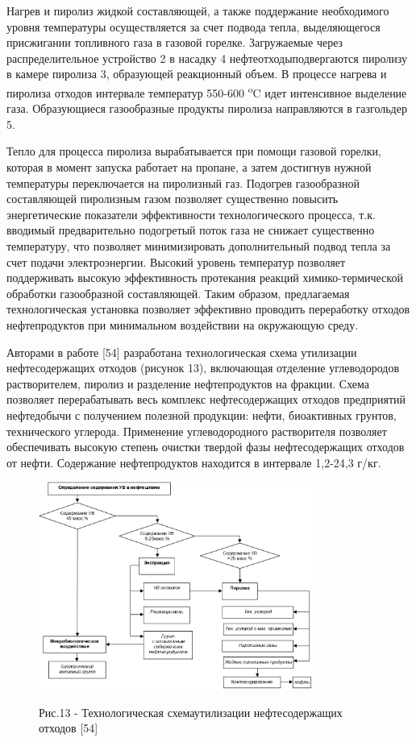 \begin{multicols}{2}
Нагрев и пиролиз жидкой составляющей, а также поддержание необходимого
уровня температуры осуществляется за счет подвода тепла, выделяющегося
присжигании топливного газа в газовой горелке. Загружаемые через
распределительное устройство 2 в насадку 4 нефтеотходыподвергаются
пиролизу в камере пиролиза 3, образующей реакционный объем. В процессе
нагрева и пиролиза отходов интервале температур 550-600
\textsuperscript{o}C идет интенсивное выделение газа. Образующиеся
газообразные продукты пиролиза направляются в газгольдер 5.

Тепло для процесса пиролиза вырабатывается при помощи газовой горелки,
которая в момент запуска работает на пропане, а затем достигнув нужной
температуры переключается на пиролизный газ. Подогрев газообразной
составляющей пиролизным газом позволяет существенно повысить
энергетические показатели эффективности технологического процесса, т.к.
вводимый предварительно подогретый поток газа не снижает существенно
температуру, что позволяет минимизировать дополнительный подвод тепла за
счет подачи электроэнергии. Высокий уровень температур позволяет
поддерживать высокую эффективность протекания реакций химико-термической
обработки газообразной составляющей. Таким образом, предлагаемая
технологическая установка позволяет эффективно проводить переработку
отходов нефтепродуктов при минимальном воздействии на окружающую среду.

Авторами в работе {[}54{]} разработана технологическая схема утилизации
нефтесодержащих отходов (рисунок 13), включающая отделение углеводородов
растворителем, пиролиз и разделение нефтепродуктов на фракции. Схема
позволяет перерабатывать весь комплекс нефтесодержащих отходов
предприятий нефтедобычи с получением полезной продукции: нефти,
биоактивных грунтов, технического углерода. Применение углеводородного
растворителя позволяет обеспечивать высокую степень очистки твердой фазы
нефтесодержащих отходов от нефти. Содержание нефтепродуктов находится в
интервале 1,2-24,3 г/кг.
\end{multicols}

\begin{figure}[H]
	\centering
	\includegraphics[width=0.8\textwidth]{media/chem2/image76}
	\caption*{}Рис.13 - Технологическая схемаутилизации нефтесодержащих
отходов {[}54{]}
\end{figure}

